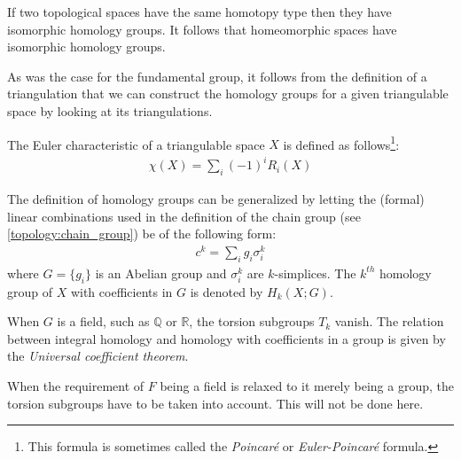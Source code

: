 	\begin{property}
		If two topological spaces have the same homotopy type then they have isomorphic homology groups. It follows that homeomorphic spaces have isomorphic homology groups.
	\end{property}
	\begin{result}
		As was the case for the fundamental group, it follows from the definition of a triangulation that we can construct the homology groups for a given triangulable space by looking at its triangulations.
	\end{result}
	
	\begin{formula}
		The Euler characteristic of a triangulable space $X$ is defined as follows\footnote{This formula is sometimes called the \textit{Poincar\'e} or \textit{Euler-Poincar\'e} formula.}:
		\begin{gather}
			\boxed{\chi(X) = \sum_i(-1)^iR_i(X)}
		\end{gather}
	\end{formula}
	
	\begin{construct}
		The definition of homology groups can be generalized by letting the (formal) linear combinations used in the definition of the chain group (see \ref{topology:chain_group}) be of the following form:
		\begin{gather}
			c^k = \sum_ig_i\sigma_i^k
		\end{gather}
		where $G = \{g_i\}$ is an Abelian group and $\sigma_i^k$ are $k$-simplices. The $k^{th}$ homology group of $X$ with coefficients in $G$ is denoted by $H_k(X; G)$.
	\end{construct}
	\begin{property}
		When $G$ is a field, such as $\mathbb{Q}$ or $\mathbb{R}$, the torsion subgroups $T_k$ vanish. The relation between integral homology and homology with coefficients in a group is given by the \textit{Universal coefficient theorem}.
	\end{property}
	
	\begin{remark*}
		When the requirement of $F$ being a field is relaxed to it merely being a group, the torsion subgroups have to be taken into account. This will not be done here.
	\end{remark*}
	
